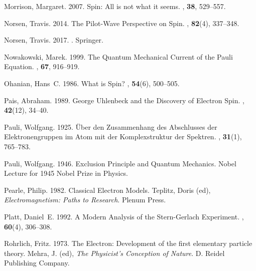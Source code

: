 \documentclass[onecolumn,secnumarabic,amsmath,amssymb,balancelastpage,nofootinbib]{article}
\begin{document}
\begin{thebibliography}{}
Morrison, Margaret. 2007.
\newblock Spin: All is not what it seems.
, {\bf 38},
  529--557.

Norsen, Travis. 2014.
\newblock The Pilot-Wave Perspective on Spin.
, {\bf 82}(4), 337--348.

Norsen, Travis. 2017.
.
\newblock Springer.

Nowakowski, Marek. 1999.
\newblock The Quantum Mechanical Current of the Pauli Equation.
, {\bf 67}, 916--919.

Ohanian, Hans~C. 1986.
\newblock What is Spin?
, {\bf 54}(6), 500--505.

Pais, Abraham. 1989.
\newblock George Uhlenbeck and the Discovery of Electron Spin.
, {\bf 42}(12), 34--40.

Pauli, Wolfgang. 1925.
\newblock \"{U}ber den Zusammenhang des Abschlusses der Elektronengruppen im
  Atom mit der Komplexstruktur der Spektren.
, {\bf 31}(1), 765--783.

Pauli, Wolfgang. 1946.
\newblock Exclusion Principle and Quantum Mechanics.
\newblock Nobel Lecture for 1945 Nobel Prize in Physics.

Pearle, Philip. 1982.
\newblock Classical Electron Models.
 Teplitz, Doris (ed), {\em Electromagnetism:
  Paths to Research}.
\newblock Plenum Press.

Platt, Daniel~E. 1992.
\newblock A Modern Analysis of the Stern-Gerlach Experiment.
, {\bf 60}(4), 306--308.

Rohrlich, Fritz. 1973.
\newblock The Electron: Development of the first elementary particle theory.
 Mehra, J. (ed), {\em The Physicist's
  Conception of Nature}.
\newblock D. Reidel Publishing Company.


\end{thebibliography}
\end{document}
